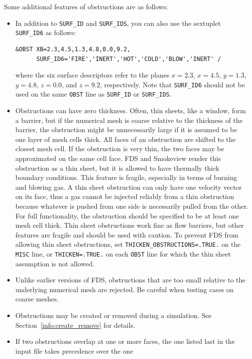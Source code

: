 \documentclass[11pt]{book}
\newcommand{\ct}{\tt\small}
\begin{document}
\vspace{\baselineskip}
\noindent
Some additional features of obstructions are as follows:
\begin{itemize}
\item In addition to {\ct SURF\_ID} and {\ct SURF\_IDS}, you can also use
the sextuplet {\ct SURF\_ID6} as follows:

\footnotesize
\begin{verbatim}
&OBST XB=2.3,4.5,1.3,4.8,0.0,9.2,
      SURF_ID6='FIRE','INERT','HOT','COLD','BLOW','INERT' /
\end{verbatim}
\normalsize
where the six surface descriptors refer to the planes $x=2.3$, $x=4.5$, $y=1.3$, $y=4.8$,
$z=0.0$, and $z=9.2$, respectively.
Note that {\ct SURF\_ID6} should not be used on the same {\ct OBST}
line as {\ct SURF\_ID} or {\ct SURF\_IDS}.
\item Obstructions can have zero thickness. Often, thin sheets, like a window, form a barrier,
but if the numerical mesh is coarse relative to the thickness of the barrier, the obstruction
might be unnecessarily large if it is assumed to be one layer of mesh cells thick. All faces
of an obstruction are shifted to the closest mesh cell. If the obstruction is very thin, the two
faces may be approximated on the same cell face. FDS and Smokeview render
this obstruction as a thin sheet, but it is allowed to have thermally
thick boundary conditions. This feature is fragile, especially in terms
of burning and blowing gas. A thin sheet obstruction can only have one velocity
vector on its face, thus a gas cannot be injected reliably from a
thin obstruction because whatever is pushed from one side is necessarily pulled from the other.
For full functionality, the obstruction should be specified to
be at least one mesh cell thick. Thin sheet obstructions
work fine as flow barriers, but other features are fragile and should be used with
caution. To prevent FDS from allowing thin sheet obstructions, set {\ct THICKEN\_OBSTRUCTIONS=.TRUE.} on the
{\ct MISC} line, or {\ct THICKEN=.TRUE.} on each {\ct OBST} line for which the thin sheet assumption is not allowed.
\item Unlike earlier versions of FDS, obstructions that are
too small relative to the underlying numerical mesh are rejected.
Be careful when testing cases on coarse meshes.
\item Obstructions may be created or removed during a simulation. See
Section~\ref{info:create_remove} for details.
\item If two obstructions overlap at one or more faces, the one listed last in the input file takes precedence over the one

\end{itemize}
\end{document}
